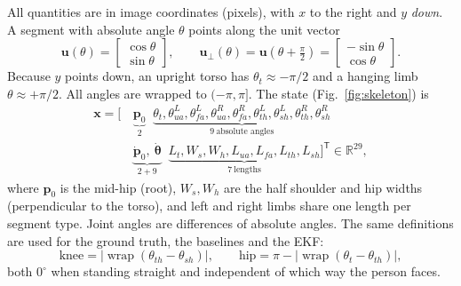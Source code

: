 \documentclass[12pt,a4paper]{article}
\newcommand{\T}{^{\mathsf{T}}}
\newcommand{\wrapop}{\operatorname{wrap}}
\begin{document}
All quantities are in image coordinates (pixels), with $x$ to the right and $y$ \emph{down}.
A segment with absolute angle $\theta$ points along the unit vector
\begin{equation}
  \mathbf{u}(\theta) = \begin{bmatrix}\cos\theta\\ \sin\theta\end{bmatrix},\qquad
  \mathbf{u}_\perp(\theta) = \mathbf{u}(\theta + \tfrac{\pi}{2}) = \begin{bmatrix}-\sin\theta\\ \cos\theta\end{bmatrix}.
\end{equation}
Because $y$ points down, an upright torso has $\theta_t\approx-\pi/2$ and a hanging limb
$\theta\approx+\pi/2$. All angles are wrapped to $(-\pi,\pi]$.
The state (Fig.~\ref{fig:skeleton}) is
\begin{equation}
  \begin{split}
  \mathbf{x} = \big[\,&\underbrace{\mathbf{p}_0}_{2}\;\;
  \underbrace{\theta_t,\theta_{ua}^{L},\theta_{fa}^{L},\theta_{ua}^{R},\theta_{fa}^{R},
  \theta_{th}^{L},\theta_{sh}^{L},\theta_{th}^{R},\theta_{sh}^{R}}_{9\ \text{absolute angles}}\\
  &\underbrace{\dot{\mathbf{p}}_0,\ \dot{\boldsymbol\theta}}_{2+9}\;\;
  \underbrace{L_t, W_s, W_h, L_{ua}, L_{fa}, L_{th}, L_{sh}}_{7\ \text{lengths}}\big]\T\in\mathbb{R}^{29},
  \end{split}
\end{equation}
where $\mathbf{p}_0$ is the mid-hip (root), $W_s, W_h$ are the half shoulder and hip widths
(perpendicular to the torso), and left and right limbs share one length per segment type.
Joint angles are differences of absolute angles. The same definitions are used for the ground truth,
the baselines and the EKF:
\begin{equation}
  \text{knee} = \big|\wrapop(\theta_{th} - \theta_{sh})\big|,\qquad
  \text{hip}  = \pi - \big|\wrapop(\theta_{t} - \theta_{th})\big|,
  \label{eq:flexion}
\end{equation}
both $0^\circ$ when standing straight and independent of which way the person faces.
\end{document}
